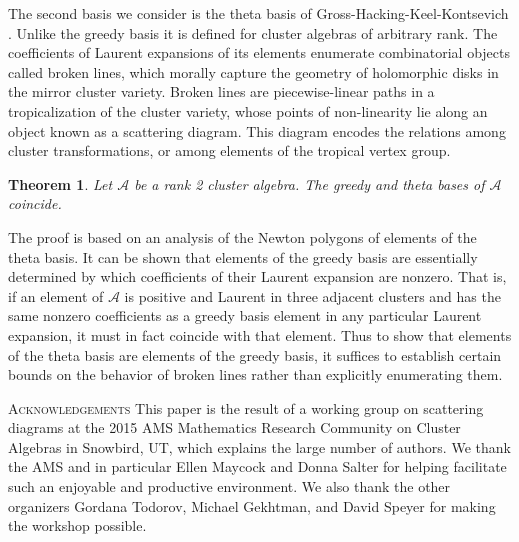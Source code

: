 \documentclass[11pt]{amsart}
\newtheorem{theorem}{Theorem}[section]
\theoremstyle{remark}
\numberwithin{equation}{section}
\begin{document}
The second basis we consider is the theta basis of Gross-Hacking-Keel-Kontsevich \cite{GHKK}.  Unlike the greedy basis it is defined for cluster algebras of arbitrary rank.  The coefficients of Laurent expansions of its elements enumerate combinatorial objects called broken lines, which morally capture the geometry of holomorphic disks in the mirror cluster variety.  Broken lines are piecewise-linear paths in a tropicalization of the cluster variety, whose points of non-linearity lie along an object known as a scattering diagram.  This diagram encodes the relations among cluster transformations, or among elements of the tropical vertex group.

\begin{theorem}
Let $\mathcal{A}$ be a rank 2 cluster algebra.  The greedy and theta bases of $\mathcal{A}$ coincide.
\end{theorem}

The proof is based on an analysis of the Newton polygons of elements of the theta basis.  It can be shown that elements of the greedy basis are essentially determined by which coefficients of their Laurent expansion are nonzero.  That is, if an element of $\mathcal{A}$ is positive and Laurent in three adjacent clusters and has the same nonzero coefficients as a greedy basis element in any particular Laurent expansion, it must in fact coincide with that element.  Thus to show that elements of the theta basis are elements of the greedy basis, it suffices to establish certain bounds on the behavior of broken lines rather than explicitly enumerating them.

\textsc{Acknowledgements} This paper is the result of a working group on scattering diagrams at the 2015 AMS Mathematics Research Community on Cluster Algebras in Snowbird, UT, which explains the large number of authors.  We thank the AMS and in particular Ellen Maycock and Donna Salter for helping facilitate such an enjoyable and productive environment.  We also thank the other organizers Gordana Todorov, Michael Gekhtman, and David Speyer for making the workshop possible.
\end{document}
